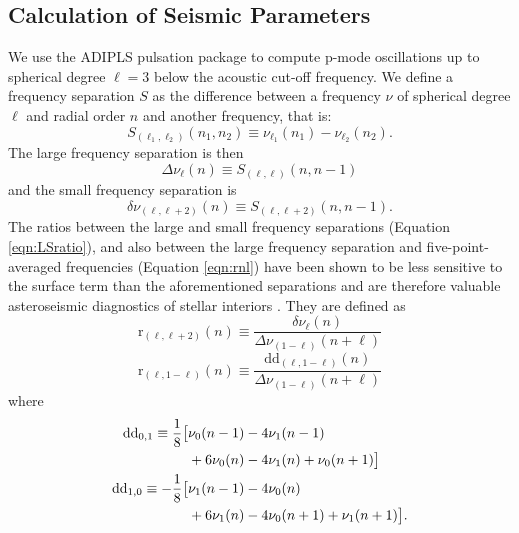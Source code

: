 \documentclass[manuscript]{aastex}
\begin{document}
\subsection{Calculation of Seismic Parameters}
\label{sec:seis}
We use the ADIPLS pulsation package \citep{2008Ap&SS.316..113C} to compute p-mode oscillations up to spherical degree $\ell=3$ below the acoustic cut-off frequency. We define a frequency separation $S$ as the difference between a frequency $\nu$ of spherical degree $\ell$ and radial order $n$ and another frequency, that is:
\begin{equation} 
  S_{(\ell_1, \ell_2)}(n_1, n_2) \equiv \nu_{\ell_1}(n_1) - \nu_{\ell_2}(n_2).
\end{equation}
The large frequency separation is then
\begin{equation} 
  \Delta\nu_\ell(n) \equiv S_{(\ell, \ell)}(n, n-1)
\end{equation}
and the small frequency separation is
\begin{equation}
  \delta\nu_{(\ell, \ell+2)}(n) \equiv S_{(\ell, \ell+2)}(n, n-1).
\end{equation}
The ratios between the large and small frequency separations (Equation \ref{eqn:LSratio}), and also between the large frequency separation and five-point-averaged frequencies (Equation \ref{eqn:rnl}) have been shown to be less sensitive to the surface term than the aforementioned separations and are therefore valuable asteroseismic diagnostics of stellar interiors \citep{2003A&A...411..215R}. They are defined as
\begin{equation} 
  \mathrm{r}_{(\ell,\ell+2)}(n) \equiv \frac{\delta\nu_\ell(n)}{\Delta\nu_{(1-\ell)}(n+\ell)} \label{eqn:LSratio}
\end{equation}
\begin{equation} 
  \mathrm{r}_{(\ell, 1-\ell)}(n) \equiv \frac{\mathrm{dd}_{(\ell,1-\ell)}(n)}{\Delta\nu_{(1-\ell)}(n+\ell)} \label{eqn:rnl}
\end{equation}
where
\begin{align} 
  \mathrm{dd}_{0,1} \equiv \frac{1}{8} \big[&\nu_0(n-1) - 4\nu_1(n-1) \notag\\
                                 &+6\nu_0(n) - 4\nu_1(n) + \nu_0(n+1)\big]\\ 
  \mathrm{dd}_{1,0} \equiv -\frac{1}{8} \big[&\nu_1(n-1) - 4\nu_0(n) \notag\\
                                 &+6\nu_1(n) - 4\nu_0(n+1) + \nu_1(n+1)\big].
\end{align}
\end{document}
